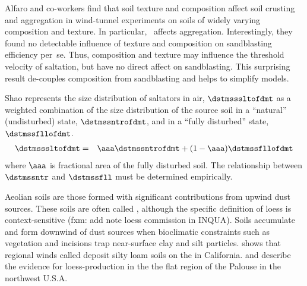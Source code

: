 \documentclass[12pt,twoside]{book}
\begin{document}
Alfaro and co-workers find that soil texture and composition affect
soil crusting and aggregation in wind-tunnel experiments on soils of
widely varying composition and texture. 
In particular, \CaCOt\ affects aggregation. %
Interestingly, they found no detectable influence of texture and
composition on sandblasting efficiency per~se.
Thus, composition and texture may influence the threshold velocity 
of saltation, but have no direct affect on sandblasting.
This surprising result de-couples composition from sandblasting
and helps to simplify models.

Shao represents the size distribution of saltators in air,
$\dstmsssltofdmt$ as a weighted combination of the size distribution
of the source soil in a ``natural'' (undisturbed) state,
$\dstmssntrofdmt$, and in a ``fully disturbed'' state,
$\dstmssfllofdmt$. 
\begin{eqnarray}
\dstmsssltofdmt & = & \aaa \dstmssntrofdmt + (1-\aaa) \dstmssfllofdmt
\label{eqn:dst_mss_slt_dfn}
\end{eqnarray}
where $\aaa$ is fractional area of the fully disturbed soil.
The relationship between $\dstmssntr$ and $\dstmssfll$ must be
determined empirically. 

Aeolian soils are those formed with significant contributions from
upwind dust sources.
These soils are often called , although the specific
definition of loess is context-sensitive (fxm: add note loess
commission in INQUA).
Soils accumulate and form downwind of dust sources when bioclimatic
constraints such as vegetation and incisions trap near-surface clay
and silt particles.  
\cite{Muh83} shows that regional winds called 
deposit silty loam soils on the  in
California. 
\cite{SGB05} and \cite{SBG05} describe the evidence for
loess-production in the the  flat region of the
Palouse in the northwest U.S.A\@. 
\end{document}
